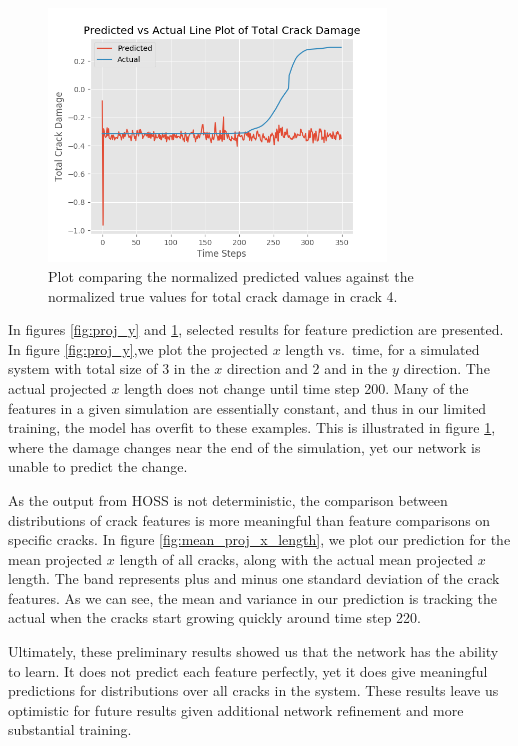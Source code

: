 \begin{figure}[!htb]
\centering
\includegraphics[width=0.8\textwidth]{images/Total_Crack_Damage_compare}
\caption{Plot comparing the normalized predicted values against the normalized true values for total crack damage in crack 4.}
\label{fig:tot_dam}
\end{figure}

In figures \ref{fig:proj_y} and \ref{fig:tot_dam}, selected results for feature prediction are presented. In figure \ref{fig:proj_y},we plot the projected $x$ length vs.\ time, for a simulated system with total size of 3 in the $x$ direction and 2 and in the $y$ direction.
The actual projected $x$ length does not change until time step 200.  Many of the features in a given simulation are essentially constant, and thus in our limited training, the model has overfit to these examples. This is illustrated in figure \ref{fig:tot_dam}, where the damage changes near the end of the simulation, yet our network is unable to predict the change.

As the output from HOSS is not deterministic, the comparison between distributions of crack features is more meaningful than feature comparisons on specific cracks. In figure \ref{fig:mean_proj_x_length}, we plot our prediction for the mean projected $x$ length of all cracks, along with the actual mean projected $x$ length. The band represents plus and minus one standard deviation of the crack features. As we can see, the mean and variance in our prediction is tracking the actual when the cracks start growing quickly around time step 220.

Ultimately, these preliminary results showed us that the network has the ability to learn. It does not predict each feature perfectly, yet it does give meaningful predictions for distributions over all cracks in the system. These results leave us optimistic for future results given additional network refinement and more substantial training.

